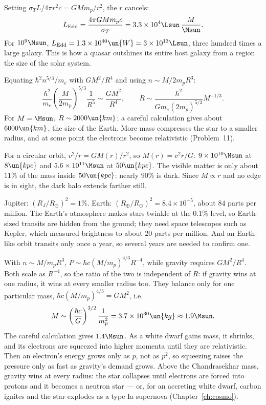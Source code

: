  Setting $\sigma_TL/4\pi r^2c = GMm_p/r^2$, the $r$ cancels:
\[
  L_{\text{Edd}} = \frac{4\pi GMm_pc}{\sigma_T} = 3.3\times10^4\Lsun\,\frac{M}{\Msun}.
\]
For $10^9\Msun$, $L_{\text{Edd}} = 1.3\times10^{40}\un{W} = 3\times10^{13}\Lsun$, three hundred times a large galaxy. This is how a quasar outshines its entire host galaxy from a region the size of the solar system.

 Equating $\hbar^2n^{5/3}/m_e$ with $GM^2/R^4$ and using $n\sim M/2m_pR^3$:
\[
  \frac{\hbar^2}{m_e}\left(\frac{M}{2m_p}\right)^{5/3}\frac{1}{R^5}\sim\frac{GM^2}{R^4},\qquad
  R\sim\frac{\hbar^2}{Gm_e(2m_p)^{5/3}}M^{-1/3}.
\]
For $M = \Msun$, $R\sim2000\un{km}$; a careful calculation gives about $6000\un{km}$, the size of the Earth. More mass compresses the star to a smaller radius, and at some point the electrons become relativistic (Problem~11).

 For a circular orbit, $v^2/r = GM(r)/r^2$, so $M(r) = v^2r/G$: $9\times10^{10}\Msun$ at $8\un{kpc}$ and $5.6\times10^{11}\Msun$ at $50\un{kpc}$. The visible matter is only about $11\%$ of the mass inside $50\un{kpc}$: nearly $90\%$ is dark. Since $M\propto r$ and no edge is in sight, the dark halo extends farther still.

 Jupiter: $(R_J/R_\odot)^2 = 1\%$. Earth: $(R_\oplus/R_\odot)^2 = 8.4\times10^{-5}$, about $84$ parts per million. The Earth's atmosphere makes stars twinkle at the $0.1\%$ level, so Earth-sized transits are hidden from the ground; they need space telescopes such as Kepler, which measured brightness to about $20$ parts per million. And an Earth-like orbit transits only once a year, so several years are needed to confirm one.

 With $n\sim M/m_pR^3$, $P\sim\hbar c(M/m_p)^{4/3}R^{-4}$, while gravity requires $GM^2/R^4$. Both scale as $R^{-4}$, so the ratio of the two is independent of $R$: if gravity wins at one radius, it wins at every smaller radius too. They balance only for one particular mass, $\hbar c(M/m_p)^{4/3} = GM^2$, i.e.
\[
  M\sim\left(\frac{\hbar c}{G}\right)^{3/2}\frac{1}{m_p^2} = 3.7\times10^{30}\un{kg}\approx1.9\Msun.
\]
The careful calculation gives $1.4\Msun$. As a white dwarf gains mass, it shrinks, and its electrons are squeezed into higher momenta until they are relativistic. Then an electron's energy grows only as $p$, not as $p^2$, so squeezing raises the pressure only as fast as gravity's demand grows. Above the Chandrasekhar mass, gravity wins at every radius: the star collapses until electrons are forced into protons and it becomes a neutron star --- or, for an accreting white dwarf, carbon ignites and the star explodes as a type Ia supernova (Chapter~\ref{ch:cosmo}).

